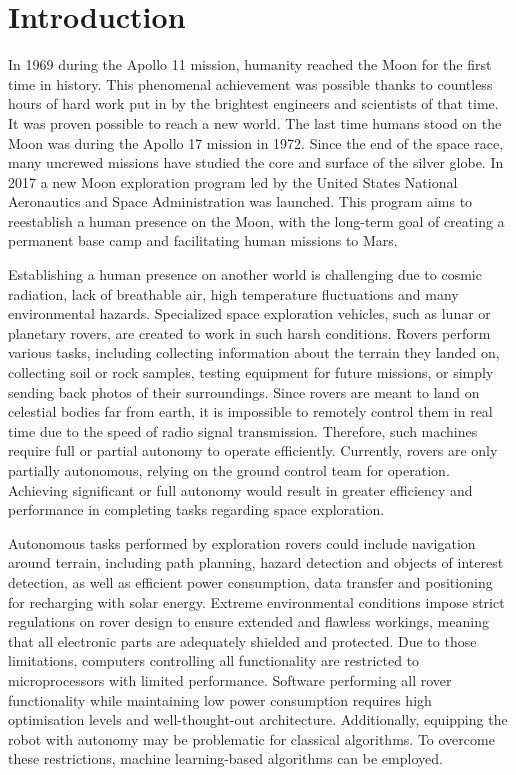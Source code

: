 \documentclass[a4paper,twoside,12pt]{book}
\begin{document}
\cleardoublepage

\pagestyle{PageNumbersChapterTitles}


\chapter{Introduction}
In 1969 during the Apollo 11 mission, humanity reached the Moon for the first time in history. This phenomenal achievement was possible thanks to countless hours of hard work put in by the brightest engineers and scientists of that time. It was proven possible to reach a new world. The last time humans stood on the Moon was during the Apollo 17 mission in 1972. Since the end of the space race, many uncrewed missions have studied the core and surface of the silver globe. In 2017 a new Moon exploration program led by the United States National Aeronautics and Space Administration was launched. This program aims to reestablish a human presence on the Moon, with the long-term goal of creating a permanent base camp and facilitating human missions to Mars.

Establishing a human presence on another world is challenging due to cosmic radiation, lack of breathable air, high temperature fluctuations and many environmental hazards. Specialized space exploration vehicles, such as lunar or planetary rovers, are created to work in such harsh conditions. Rovers perform various tasks, including collecting information about the terrain they landed on, collecting soil or rock samples, testing equipment for future missions, or simply sending back photos of their surroundings.  Since rovers are meant to land on celestial bodies far from earth, it is impossible to remotely control them in real time due to the speed of radio signal transmission. Therefore, such machines require full or partial autonomy to operate efficiently. Currently, rovers are only partially autonomous, relying on the ground control team for operation. Achieving significant or full autonomy would result in greater efficiency and performance in completing tasks regarding space exploration.

Autonomous tasks performed by exploration rovers could include navigation around terrain, including path planning, hazard detection and objects of interest detection, as well as efficient power consumption, data transfer and positioning for recharging with solar energy. Extreme environmental conditions impose strict regulations on rover design to ensure extended and flawless workings, meaning that all electronic parts are adequately shielded and protected. Due to those limitations, computers controlling all functionality are restricted to microprocessors with limited performance. Software performing all rover functionality while maintaining low power consumption requires high optimisation levels and well-thought-out architecture. Additionally, equipping the robot with autonomy may be problematic for classical algorithms. To overcome these restrictions, machine learning-based algorithms can be employed.
\end{document}
